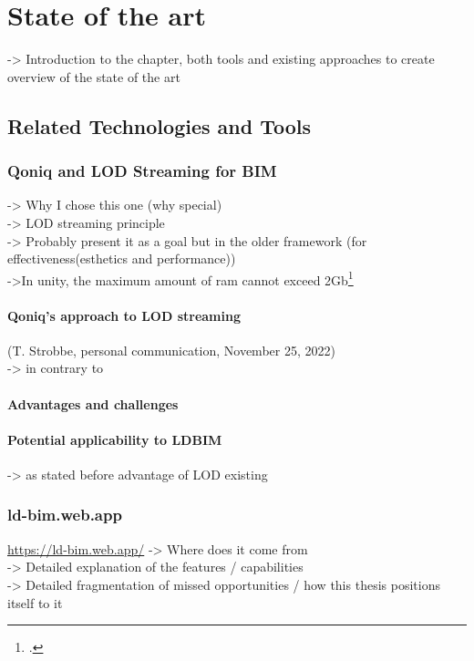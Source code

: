 \chapter{State of the art}
-> Introduction to the chapter, both tools and existing approaches to create overview of the state of the art

\section{Related Technologies and Tools}
\subsection{Qoniq and LOD Streaming for BIM}
-> Why I chose this one (why special)\\
-> LOD streaming principle\\
-> Probably present it as a goal but in the older framework (for effectiveness(esthetics and performance))\\
->In unity, the maximum amount of ram cannot exceed 2Gb\footcite{UnityWebGL}

\subsubsection{Qoniq's approach to LOD streaming}
(T. Strobbe, personal communication, November 25, 2022)\\
-> in contrary to \cite{Johansson2015}

\subsubsection{Advantages and challenges}

\subsubsection{Potential applicability to LDBIM}
-> as stated before advantage of LOD existing

\subsection{ld-bim.web.app}
\url{https://ld-bim.web.app/}
-> Where does it come from\\
-> Detailed explanation of the features / capabilities\\
-> Detailed fragmentation of missed opportunities / how this thesis positions itself to it

